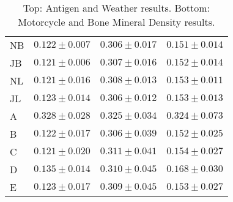 \documentclass[twoside]{article} \usepackage{aistats2017}
\theoremstyle{definition}
\theoremstyle{theorem}
\begin{document}
\begin{table*}
\begin{center}
{\begin{tabular}{l|ccc}
									NB & $0.122 \pm 0.007$ & $\mathbf{0.306 \pm 0.017}$ & $\mathbf{0.151 \pm
										0.014}$ \\
									JB & $0.121 \pm 0.006$ & $0.307 \pm 0.016$ & $0.152 \pm 0.014$ \\
									NL & $0.121 \pm 0.016$ & $0.308 \pm 0.013$ & $0.153 \pm 0.011$ \\
									JL & $0.123 \pm 0.014$ & $\mathbf{0.306 \pm 0.012}$ & $0.153 \pm 0.013$ \\
									A & $0.328 \pm 0.028$ & $0.325 \pm 0.034$ & $0.324 \pm 0.073$ \\
									B & $0.122 \pm 0.017$ & $\mathbf{0.306 \pm 0.039}$ & $0.152 \pm 0.025$ \\
									C & $0.121 \pm 0.020$ & $0.311 \pm 0.041$ & $0.154 \pm 0.027$ \\
									D & $0.135 \pm 0.014$ & $0.310 \pm 0.045$ & $0.168 \pm 0.030$ \\
									E & $0.123 \pm 0.017$ & $0.309 \pm 0.045$ & $0.153 \pm 0.027$
								\end{tabular}}
							\end{center}
							\caption{Top: Antigen and Weather results. Bottom: Motorcycle and Bone Mineral Density results.}
							\label{table:results}
						\end{table*}
						
						
\end{document}
